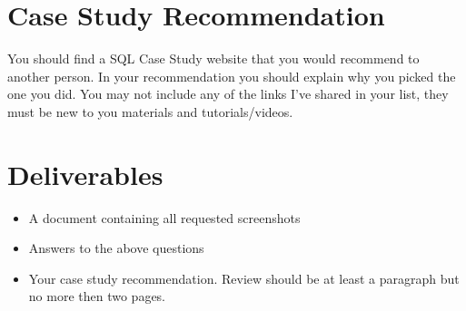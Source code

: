 \documentclass[12pt]{article}
\begin{document}
    \section*{Case Study Recommendation}
You should find a SQL Case Study website that you would recommend to another person.  In your recommendation you should explain why you picked the one you did. You may not include any of the links I've shared in your list, they must be new to you materials and tutorials/videos. 


\section*{Deliverables}
\begin{itemize}
    \item A document containing all requested screenshots
    \item Answers to the above questions
    \item Your case study recommendation.  Review should be at least a paragraph but no more then two pages. 
\end{itemize} 
\end{document}
